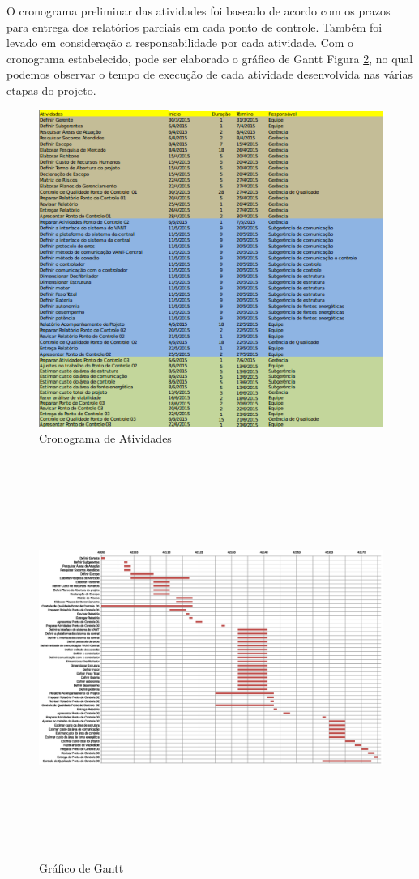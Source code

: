 O cronograma preliminar das atividades foi baseado de acordo com os prazos para entrega dos relatórios parciais em cada ponto de controle. 
Também foi levado em consideração a responsabilidade por cada atividade.
Com o cronograma estabelecido, pode ser elaborado o gráfico de Gantt Figura \ref{fig:gantt}, no qual podemos observar o
tempo de execução de cada atividade desenvolvida nas várias etapas do projeto. 
% 
 \begin{figure}[!ht]
	\centering
		\includegraphics[keepaspectratio=true,scale=0.9]{figuras/cronograma.png}
	\caption{Cronograma de Atividades}
	\label{fig:cronograma}
\end{figure}

 \begin{figure}[H]
	\flushleft
		\includegraphics[height=13cm,width=18cm]{figuras/gantt.eps}
	\caption{Gráfico de Gantt}
	\label{fig:gantt}
\end{figure}
